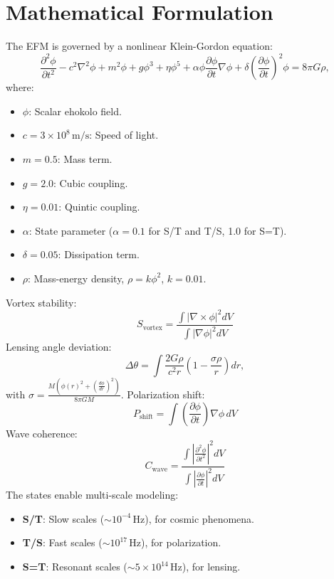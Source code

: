 \documentclass[11pt]{article}
\begin{document}
\section{Mathematical Formulation}
The EFM is governed by a nonlinear Klein-Gordon equation:
\begin{equation}
\frac{\partial^2 \phi}{\partial t^2} - c^2 \nabla^2 \phi + m^2 \phi + g \phi^3 + \eta \phi^5 + \alpha \phi \frac{\partial \phi}{\partial t} \nabla \phi + \delta \left(\frac{\partial \phi}{\partial t}\right)^2 \phi = 8 \pi G \rho,
\end{equation}
where:
\begin{itemize}
    \item \(\phi\): Scalar ehokolo field.
    \item \(c = 3 \times 10^8 \, \text{m/s}\): Speed of light.
    \item \(m = 0.5\): Mass term.
    \item \(g = 2.0\): Cubic coupling.
    \item \(\eta = 0.01\): Quintic coupling.
    \item \(\alpha\): State parameter (\(\alpha = 0.1\) for S/T and T/S, 1.0 for S=T).
    \item \(\delta = 0.05\): Dissipation term.
    \item \(\rho\): Mass-energy density, \(\rho = k \phi^2\), \(k = 0.01\).
\end{itemize}
Vortex stability:
\begin{equation}
S_{\text{vortex}} = \frac{\int |\nabla \times \phi|^2 dV}{\int |\nabla \phi|^2 dV}
\end{equation}
Lensing angle deviation:
\begin{equation}
\Delta \theta = \int \frac{2 G \rho}{c^2 r} \left( 1 - \frac{\sigma \rho}{r} \right) dr,
\end{equation}
with \(\sigma = \frac{M \left( \phi(r)^2 + \left( \frac{d\phi}{dr} \right)^2 \right)}{8 \pi G M}\).
Polarization shift:
\begin{equation}
P_{\text{shift}} = \int \left( \frac{\partial \phi}{\partial t} \right) \nabla \phi \, dV
\end{equation}
Wave coherence:
\begin{equation}
C_{\text{wave}} = \frac{\int \left| \frac{\partial^2 \phi}{\partial t^2} \right|^2 dV}{\int \left| \frac{\partial \phi}{\partial t} \right|^2 dV}
\end{equation}
The states enable multi-scale modeling:
\begin{itemize}
    \item \textbf{S/T}: Slow scales (\(\sim 10^{-4} \, \text{Hz}\)), for cosmic phenomena.
    \item \textbf{T/S}: Fast scales (\(\sim 10^{17} \, \text{Hz}\)), for polarization.
    \item \textbf{S=T}: Resonant scales (\(\sim 5 \times 10^{14} \, \text{Hz}\)), for lensing.
\end{itemize}
\end{document}
